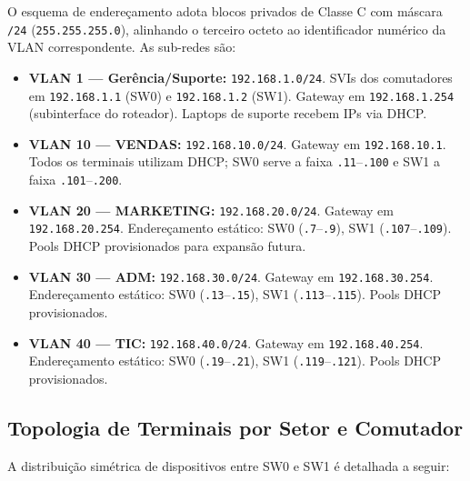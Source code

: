 \begin{sloppypar}
O esquema de endereçamento adota blocos privados de Classe C com máscara \texttt{/24}
(\texttt{255.255.255.0}), alinhando o terceiro octeto ao identificador numérico da
VLAN correspondente. As sub-redes são:

\begin{itemize}[leftmargin=2em]
  \item \textbf{VLAN 1 --- Gerência/Suporte:} \texttt{192.168.1.0/24}. SVIs dos
        comutadores em \texttt{192.168.1.1} (SW0) e \texttt{192.168.1.2} (SW1).
        Gateway em \texttt{192.168.1.254} (subinterface do roteador). Laptops de
        suporte recebem IPs via DHCP.

  \item \textbf{VLAN 10 --- VENDAS:} \texttt{192.168.10.0/24}. Gateway em
        \texttt{192.168.10.1}. Todos os terminais utilizam DHCP; SW0 serve a
        faixa \texttt{.11}--\texttt{.100} e SW1 a faixa \texttt{.101}--\texttt{.200}.

  \item \textbf{VLAN 20 --- MARKETING:} \texttt{192.168.20.0/24}. Gateway em
        \texttt{192.168.20.254}. Endereçamento estático: SW0 (\texttt{.7}--\texttt{.9}),
        SW1 (\texttt{.107}--\texttt{.109}). Pools DHCP provisionados para
        expansão futura.

  \item \textbf{VLAN 30 --- ADM:} \texttt{192.168.30.0/24}. Gateway em
        \texttt{192.168.30.254}. Endereçamento estático: SW0 (\texttt{.13}--\texttt{.15}),
        SW1 (\texttt{.113}--\texttt{.115}). Pools DHCP provisionados.

  \item \textbf{VLAN 40 --- TIC:} \texttt{192.168.40.0/24}. Gateway em
        \texttt{192.168.40.254}. Endereçamento estático: SW0 (\texttt{.19}--\texttt{.21}),
        SW1 (\texttt{.119}--\texttt{.121}). Pools DHCP provisionados.
\end{itemize}
\end{sloppypar}

\subsection{Topologia de Terminais por Setor e Comutador}

A distribuição simétrica de dispositivos entre SW0 e SW1 é detalhada a seguir:


